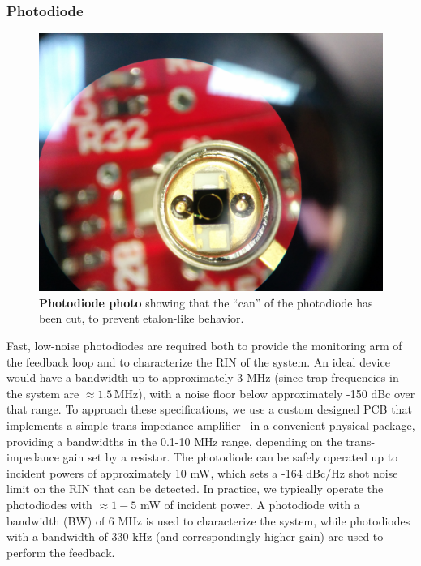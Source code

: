 \documentclass[twocolumn,aps,pra,showpacs,preprintnumbers,bibnotes]{revtex4-1}
\begin{document}
\subsubsection{Photodiode}

\begin{figure}
  \begin{center}
    \includegraphics[width=\columnwidth]{Figure8.jpg}
    \caption{\textbf{Photodiode photo} showing that the ``can'' of the photodiode has been cut, to prevent etalon-like behavior.}\label{fig:cut_pd}
  \end{center}
\end{figure}

Fast, low-noise photodiodes are required both to provide the monitoring arm of the feedback loop and to characterize the RIN of the system.
An ideal device would have a bandwidth up to approximately 3 MHz (since trap frequencies in the system are $\approx1.5\,$MHz), with a noise floor below approximately -150 dBc over that range.
To approach these specifications, we use a custom designed PCB that implements a simple trans-impedance amplifier~\cite{Graeme1995} in a convenient physical package, providing a bandwidths in the 0.1-10 MHz range, depending on the trans-impedance gain set by a resistor.
The photodiode can be safely operated up to incident powers of approximately 10 mW, which sets a -164 dBc/Hz shot noise limit on the RIN that can be detected.
In practice, we typically operate the photodiodes with $\approx 1-5$ mW of incident power.
A photodiode with a bandwidth (BW) of 6 MHz is used to characterize the system, while photodiodes with a bandwidth of 330 kHz (and correspondingly higher gain) are used to perform the feedback.
\end{document}
